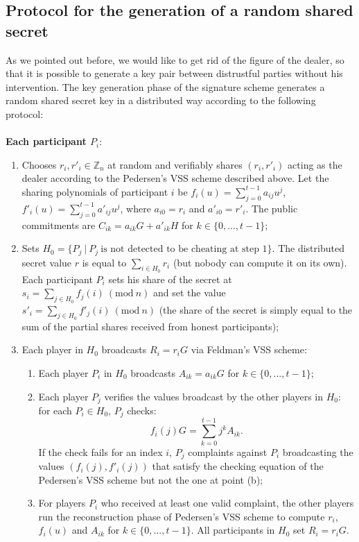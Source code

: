 \bigskip

\subsection{Protocol for the generation of a random shared secret}
\label{subsec:2}
As we pointed out before, we would like to get rid of the figure of the dealer, so that it is possible to generate a key pair between distrustful parties without his intervention. The key generation phase of the signature scheme generates a random shared secret key in a distributed way according to the following protocol:
\\
\\
{\bf Each participant $P_i$}:
\begin{enumerate}
	\item Chooses $r_i, r'_i \in \mathbb{Z}_n$ at random and verifiably shares $(r_i, r'_i)$ acting as the dealer according to the Pedersen's VSS scheme described above. Let the sharing polynomials of participant $i$ be $f_i(u) = \sum_{j = 0}^{t - 1}a_{ij}u^j$, $f'_i(u) = \sum_{j= 0}^{t - 1}a'_{ij}u^j$, where $a_{i0} = r_i$ and $a'_{i0} = r'_i$. The public commitments are $C_{ik} = a_{ik}G + a'_{ik}H$ for $k \in \{0, ..., t - 1\}$;
	\item Sets $H_0 = \{P_j \ | \ P_j \ \text{is not detected to be cheating at step 1}\}$. The distributed secret value $r$ is equal to $\sum_{i \in H_0}r_i$ (but nobody can compute it on its own). Each participant $P_i$ sets his share of the secret at $s_i= \sum_{j \in H_0}f_j(i) \ (\text{mod} \ n)$ and set the value $s'_i = \sum_{j \in H_0}f'_j(i) \ (\text{mod} \ n)$ (the share of the secret is simply equal to the sum of the partial shares received from honest participants);
	\item Each player in $H_0$ broadcasts $R_i = r_iG$ via Feldman's VSS scheme:
	\begin{enumerate}
		\item Each player $P_i$ in $H_0$ broadcasts $A_{ik} = a_{ik}G$ for $k \in \{0, ..., t - 1\}$;
		\item Each player $P_j$ verifies the values broadcast by the other players in $H_0$: for each $P_i \in H_0$, $P_j$ checks:
		$$f_i(j)G = \sum_{k = 0}^{t - 1} j^kA_{ik}.$$
		If the check fails for an index $i$, $P_j$ complaints against $P_i$ broadcasting the values $(f_i(j), f'_i(j))$ that satisfy the checking equation of the Pedersen's VSS scheme  but not the one at point (b);
		\item For players $P_i$ who received at least one valid complaint, the other players run the reconstruction phase of Pedersen's VSS scheme to compute $r_i$, $f_i(u)$ and $A_{ik}$ for $k \in \{0, ..., t - 1\}$. All participants in $H_0$ set $R_i = r_iG$. 
	\end{enumerate} 
\end{enumerate}
